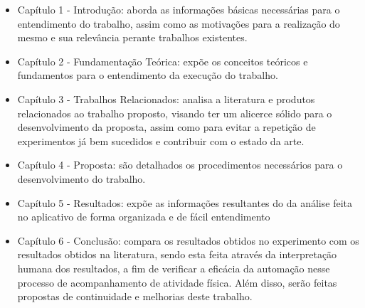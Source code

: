     \begin{itemize}
        \item {Capítulo 1 - Introdução}: aborda as informações básicas necessárias para o entendimento do trabalho, assim como as motivações para a realização do mesmo e sua relevância perante trabalhos existentes.
        \item {Capítulo 2 - Fundamentação Teórica}: expõe os conceitos teóricos e fundamentos para o entendimento da execução do trabalho.
        \item {Capítulo 3 - Trabalhos Relacionados}: analisa a literatura e produtos relacionados ao trabalho proposto, visando ter um alicerce sólido para o desenvolvimento da proposta, assim como para evitar a repetição de experimentos já bem sucedidos e contribuir com o estado da arte.
        \item {Capítulo 4 - Proposta}: são detalhados os procedimentos necessários para o desenvolvimento do trabalho.
        \item {Capítulo 5 - Resultados}: expõe as informações resultantes do da análise feita no aplicativo de forma organizada e de fácil entendimento
        \item {Capítulo 6 - Conclusão}: compara os resultados obtidos no experimento com os resultados obtidos na literatura, sendo esta feita através da interpretação humana dos resultados, a fim de verificar a eficácia da automação nesse processo de acompanhamento de atividade física. Além disso, serão feitas propostas de continuidade e melhorias deste trabalho.
    \end{itemize}

